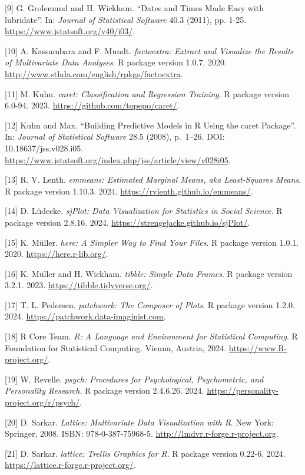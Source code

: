 \documentclass[
  letterpaper,
  DIV=11,
  numbers=noendperiod]{scrreprt}
\begin{document}
{[}9{]} G. Grolemund and H. Wickham. ``Dates and Times Made Easy with
lubridate''. In: \emph{Journal of Statistical Software} 40.3 (2011), pp.
1-25. \url{https://www.jstatsoft.org/v40/i03/}.

{[}10{]} A. Kassambara and F. Mundt. \emph{factoextra: Extract and
Visualize the Results of Multivariate Data Analyses}. R package version
1.0.7. 2020. \url{http://www.sthda.com/english/rpkgs/factoextra}.

{[}11{]} M. Kuhn. \emph{caret: Classification and Regression Training}.
R package version 6.0-94. 2023. \url{https://github.com/topepo/caret/}.

{[}12{]} Kuhn and Max. ``Building Predictive Models in R Using the caret
Package''. In: \emph{Journal of Statistical Software} 28.5 (2008),
p.~1--26. DOI: 10.18637/jss.v028.i05.
\url{https://www.jstatsoft.org/index.php/jss/article/view/v028i05}.

{[}13{]} R. V. Lenth. \emph{emmeans: Estimated Marginal Means, aka
Least-Squares Means}. R package version 1.10.3. 2024.
\url{https://rvlenth.github.io/emmeans/}.

{[}14{]} D. Lüdecke. \emph{sjPlot: Data Visualization for Statistics in
Social Science}. R package version 2.8.16. 2024.
\url{https://strengejacke.github.io/sjPlot/}.

{[}15{]} K. Müller. \emph{here: A Simpler Way to Find Your Files}. R
package version 1.0.1. 2020. \url{https://here.r-lib.org/}.

{[}16{]} K. Müller and H. Wickham. \emph{tibble: Simple Data Frames}. R
package version 3.2.1. 2023. \url{https://tibble.tidyverse.org/}.

{[}17{]} T. L. Pedersen. \emph{patchwork: The Composer of Plots}. R
package version 1.2.0. 2024. \url{https://patchwork.data-imaginist.com}.

{[}18{]} R Core Team. \emph{R: A Language and Environment for
Statistical Computing}. R Foundation for Statistical Computing. Vienna,
Austria, 2024. \url{https://www.R-project.org/}.

{[}19{]} W. Revelle. \emph{psych: Procedures for Psychological,
Psychometric, and Personality Research}. R package version 2.4.6.26.
2024. \url{https://personality-project.org/r/psych/}.

{[}20{]} D. Sarkar. \emph{Lattice: Multivariate Data Visualization with
R}. New York: Springer, 2008. ISBN: 978-0-387-75968-5.
\url{http://lmdvr.r-forge.r-project.org}.

{[}21{]} D. Sarkar. \emph{lattice: Trellis Graphics for R}. R package
version 0.22-6. 2024. \url{https://lattice.r-forge.r-project.org/}.
\end{document}
